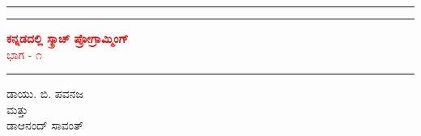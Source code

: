 \begin{titlepage} %
	
	\centering %
	
	
	\rule{\textwidth}{1pt} %
	
	\vspace{2pt}\vspace{-\baselineskip} %
	
	\rule{\textwidth}{0.4pt} %
	
	\vspace{0.1\textheight} %
	
\begin{center}	
	\textcolor{red}{ %
		{\Huge\textbf{ಕನ್ನಡದಲ್ಲಿ ಸ್ಕ್ರಾಚ್ ಪ್ರೋಗ್ರಾಮ್ಮಿಂಗ್\\}
		\huge{ಭಾಗ - ೧}
	}
}
\end{center}
	\vspace{0.025\textheight} %
	
	\rule{0.3\textwidth}{0.4pt} %
	
	\vspace{0.1\textheight} %
	
	\begin{center}
	{\Large \textsc{ಡಾ\hspace{0.3mm}\vline\hspace{0.5mm}\vline \hspace{1mm}ಯು. ಬಿ. ಪವನಜ}}\\
	ಮತ್ತು\\
	{\Large \textsc{ಡಾ\hspace{0.3mm}\vline\hspace{0.5mm}\vline \hspace{1mm}ಆನಂದ್ ಸಾವಂತ್}} %
	\end{center}
	

\end{titlepage}
